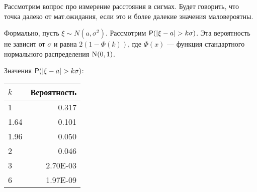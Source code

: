 \begin{enumerate}
Рассмотрим вопрос про измерение расстояния в сигмах.
Будет говорить, что точка далеко от мат.ожидания, если это и более далекие значения маловероятны.

Формально, пусть $\xi\sim N(a,\sigma^2)$. Рассмотрим $\P(|\xi - a|> k \sigma)$. Эта вероятность не зависит от $\sigma$ и равна $2(1- \Phi(k))$, где $\Phi(x)$ --- функция стандартного нормального распределения $\mathrm{N}(0,1)$.

Значения $\P(|\xi - a|> k\sigma)$:\\
\begin{tabular}{l|r}
\hline
$k$& Вероятность\\
\hline
1&	0.317\\
1.64&	0.101\\
1.96&	0.050\\
2	&0.046\\
3	&2.70E-03\\
6	&1.97E-09\\
\hline
\end{tabular}


\end{enumerate}
